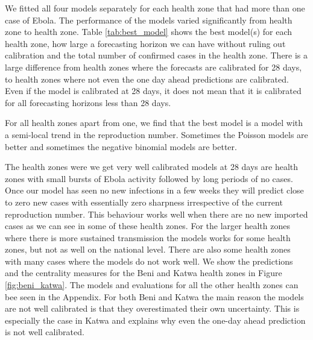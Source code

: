 \documentclass[12pt]{article}
\begin{document}
We fitted all four models separately for each health zone that had more than one case of Ebola. The performance of the models varied significantly from health zone to health zone. Table \ref{tab:best_model} shows the best model(s) for each health zone, how large a forecasting horizon we can have without ruling out calibration and the total number of confirmed cases in the health zone. There is a large difference from health zones where the forecasts are calibrated for 28 days, to health zones where not even the one day ahead predictions are calibrated. Even if the model is calibrated at 28 days, it does not mean that it is calibrated for all forecasting horizons less than 28 days. 




For all health zones apart from one, we find that the best model is a model with a semi-local trend in the reproduction number. Sometimes the Poisson models are better and sometimes the negative binomial models are better.

The health zones were we get very well calibrated models at 28 days are health zones with small bursts of Ebola activity followed by long periods of no cases. Once our model has seen no new infections in a few weeks they will predict close to zero new cases with essentially zero sharpness irrespective of the current reproduction number. This behaviour works well when there are no new imported cases as we can see in some of these health zones. For the larger health zones where there is more sustained transmission the models works for some health zones, but not as well on the national level. There are also some health zones with many cases where the models do not work well. We show the predictions and the centrality measures for the Beni and Katwa health zones in Figure \ref{fig:beni_katwa}. The models and evaluations for all the other health zones can bee seen in the Appendix. For both Beni and Katwa the main reason the models are not well calibrated is that they overestimated their own uncertainty. This is especially the case in Katwa and explains why even the one-day ahead prediction is not well calibrated. 
\end{document}
